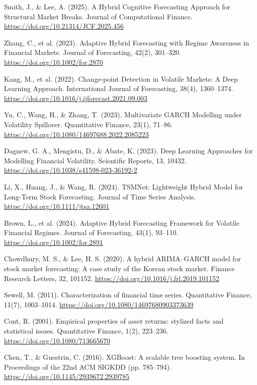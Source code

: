 \documentclass[conference]{IEEEtran}
\begin{document}
\begin{thebibliography}{99}
 Smith, J., \& Lee, A. (2025). A Hybrid Cognitive Forecasting Approach for Structural Market Breaks. Journal of Computational Finance. \url{https://doi.org/10.21314/JCF.2025.456}

 Zhang, C., et al. (2023). Adaptive Hybrid Forecasting with Regime Awareness in Financial Markets. Journal of Forecasting, 42(2), 301–320. \url{https://doi.org/10.1002/for.2870}

 Kang, M., et al. (2022). Change-point Detection in Volatile Markets: A Deep Learning Approach. International Journal of Forecasting, 38(4), 1360–1374. \url{https://doi.org/10.1016/j.ijforecast.2021.09.003}

 Yu, C., Wang, H., \& Zhang, T. (2023). Multivariate GARCH Modelling under Volatility Spillover. Quantitative Finance, 23(1), 71–86. \url{https://doi.org/10.1080/14697688.2022.2085223}

 Dagnew, G. A., Mengistu, D., \& Abate, K. (2023). Deep Learning Approaches for Modelling Financial Volatility. Scientific Reports, 13, 10432. \url{https://doi.org/10.1038/s41598-023-36192-2}

 Li, X., Huang, J., \& Wang, R. (2024). TSMNet: Lightweight Hybrid Model for Long-Term Stock Forecasting. Journal of Time Series Analysis. \url{https://doi.org/10.1111/jtsa.12601}

 Brown, L., et al. (2024). Adaptive Hybrid Forecasting Framework for Volatile Financial Regimes. Journal of Forecasting, 43(1), 93–110. \url{https://doi.org/10.1002/for.2891}




 Chowdhury, M. S., \& Lee, H. S. (2020). A hybrid ARIMA–GARCH model for stock market forecasting: A case study of the Korean stock market. Finance Research Letters, 32, 101152. \url{https://doi.org/10.1016/j.frl.2019.101152}

 Sewell, M. (2011). Characterization of financial time series. Quantitative Finance, 11(7), 1003–1014. \url{https://doi.org/10.1080/14697680903373639}

 Cont, R. (2001). Empirical properties of asset returns: stylized facts and statistical issues. Quantitative Finance, 1(2), 223–236. \url{https://doi.org/10.1080/713665670}

 Chen, T., \& Guestrin, C. (2016). XGBoost: A scalable tree boosting system. In Proceedings of the 22nd ACM SIGKDD (pp. 785–794). \url{https://doi.org/10.1145/2939672.2939785}


\end{thebibliography}
\end{document}
